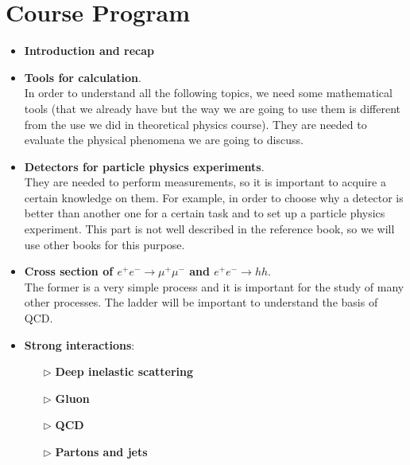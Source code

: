 \documentclass[../../main/main.tex]{subfiles}
\begin{document}
\section*{Course Program}
\begin{itemize}
    \item \textbf{Introduction and recap}

    \item \textbf{Tools for calculation}.\\
        In order to understand all the following topics, we need some mathematical tools (that we already have but the way we are going to use them is different from the use we did in theoretical physics course). They are needed to evaluate the physical phenomena we are going to discuss.

    \item \textbf{Detectors for particle physics experiments}.\\
        They are needed to perform measurements, so it is important to acquire a certain knowledge on them. For example, in order to choose why a detector is better than another one for a certain task and to set up a particle physics experiment. This part is not well described in the reference book, so we will use other books for this purpose.

    \item \textbf{Cross section of \( e^+ e^- \longrightarrow \mu^+ \mu^- \) and \( e^+ e^- \longrightarrow hh \)}.\\
        The former is a very simple process and it is important for the study of many other processes. The ladder will be important to understand the basis of QCD.

    \item \textbf{Strong interactions}:
    \begin{itemize}
        \item[\(\triangleright\)] \textbf{Deep inelastic scattering}
        \item[\(\triangleright\)] \textbf{Gluon}
        \item[\(\triangleright\)] \textbf{QCD}
        \item[\(\triangleright\)] \textbf{Partons and jets}
    \end{itemize}


\end{itemize}
\end{document}
